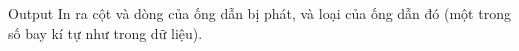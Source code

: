 Output
In ra cột và dòng của ống dẫn bị phát, và loại của ống dẫn đó (một trong số bay kí tự như trong dữ liệu).